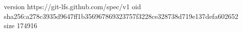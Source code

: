 version https://git-lfs.github.com/spec/v1
oid sha256:a278c3935d9647ff1b356967869323757f3228ce328738d719e137defa602652
size 174916
